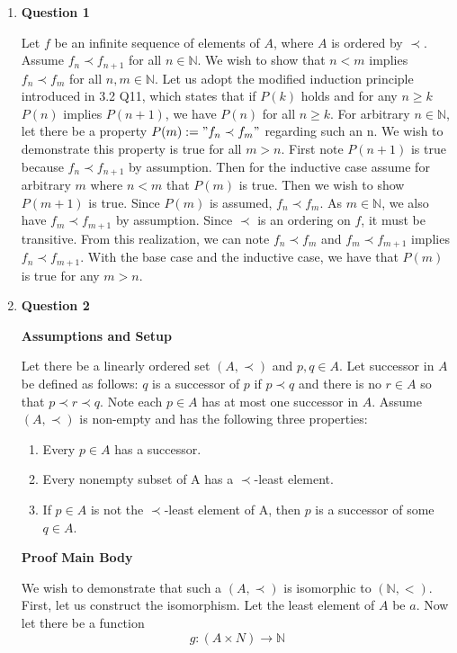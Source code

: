 \documentclass{article}
\begin{document}
	\begin{enumerate}
	\item \textbf{Question 1}
	\medskip
	
	Let $f$ be an infinite sequence of elements of $A$, where $A$ is ordered by $\prec$. Assume $f_n \prec f_{n + 1}$ for all $n \in \mathbb{N}$. We wish to show that $n < m$ implies $f_n \prec f_m$ for all $n, m \in \mathbb{N}$. Let us adopt the modified induction principle introduced in 3.2 Q11, which states that if $P(k)$ holds and for any $n \geq k$ $P(n)$ implies $P(n + 1)$, we have $P(n)$ for all $n \geq k$. For arbitrary $n \in \mathbb{N}$, let there be a property $P(m) := "f_n \prec f_m"$ regarding such an n. We wish to demonstrate this property is true for all $m > n$.  First note $P(n + 1)$ is true because $f_{n} \prec f_{n + 1}$ by assumption. Then for the inductive case assume for arbitrary $m$ where $n < m$ that $P(m)$ is true. Then we wish to show $P(m + 1)$ is true. Since $P(m)$ is assumed, $f_n \prec f_m$. As $m \in \mathbb{N}$, we also have $f_m \prec f_{m + 1}$ by assumption. Since $\prec$ is an ordering on $f$, it must be transitive. From this realization, we can note $f_n \prec f_m$ and $f_m \prec f_{m + 1}$ implies $f_n \prec f_{m + 1}$. With the base case and the inductive case, we have that $P(m)$ is true for any $m > n$.
	
	\item \textbf{Question 2}
	
	\medskip
	\textbf{Assumptions and Setup}
	\medskip
	
	Let there be a linearly ordered set $(A, \prec)$ and $p,q \in A$. Let successor in $A$ be defined as follows: $q$ is a successor of $p$ if $p \prec q$ and there is no $r \in A$ so that $p \prec r \prec q$. Note each $p \in A$ has at most one successor in $A$. Assume $(A, \prec)$ is non-empty and has the following three properties:
	
	\begin{enumerate}
		\item Every $p \in A$ has a successor.
		\item Every nonempty subset of A has a $\prec$-least element.
		\item If $p \in A$ is not the $\prec$-least element of A, then $p$ is a successor of some $q \in A$.
	\end{enumerate}
	
	\medskip
	\textbf{Proof Main Body}
	\medskip
	
	We wish to demonstrate that such a $(A, \prec)$ is isomorphic to $(\mathbb{N}, <)$. First, let us construct the isomorphism. Let the least element of $A$ be $a$. Now let there be a function $$g: (A \times N) \xrightarrow{} \mathbb{N}$$
	

\end{enumerate}
\end{document}
